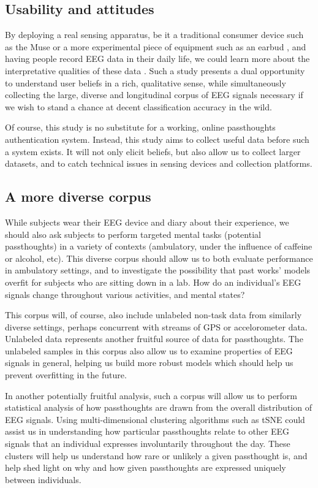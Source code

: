 \documentclass[sigconf]{acmart}
\begin{document}
\subsection{Usability and attitudes}
\label{sec:org84ed4c0}
By deploying a real sensing apparatus, be it a traditional consumer device such as the Muse \cite{Mihajlovic2015} 
or a more experimental piece of equipment such as an earbud \cite{UnitedSciences}, 
and having people record EEG data in their daily life, we could learn more about the interpretative qualities of these data  \cite{NafusDawn;Sherman2014}.
Such a study presents a dual opportunity to understand user beliefs in a rich, qualitative sense, while simultaneously collecting the large, diverse and longitudinal corpus of EEG signals necessary if we wish to stand a chance at decent classification accuracy in the wild.

Of course, this study is no substitute for a working, online passthoughts authentication system.
Instead, this study aims to collect useful data before such a system exists.
It will not only elicit beliefs, 
but also allow us to collect larger datasets, 
and to catch technical issues in sensing devices and collection platforms.

\subsection{A more diverse corpus}
\label{sec:org890dc35}

While subjects wear their EEG device and diary about their experience, we should also ask subjects to perform
targeted mental tasks (potential passthoughts) in a variety of contexts (ambulatory, under the influence of caffeine or alcohol, etc). 
This diverse corpus should allow us to both evaluate performance in ambulatory settings, and to
investigate the possibility that past works' models overfit for subjects who are sitting down in a lab.
How do an individual's EEG signals change throughout various activities, and mental states?

This corpus will, of course, also include unlabeled non-task data from similarly diverse settings, perhaps concurrent with streams of GPS or accelorometer data.
Unlabeled data represents another fruitful source of data for passthoughts.
The unlabeled samples in this corpus also allow us to examine properties of EEG signals in general, helping us build more robust models which should help us prevent overfitting in the future.

In another potentially fruitful analysis, such a corpus will allow us to perform statistical analysis of how passthoughts are drawn from the overall distribution of EEG signals. 
Using multi-dimensional clustering algorithms such as tSNE \cite{VanDerMaaten2008} 
could assist us in understanding how particular passthoughts relate to other EEG signals that an individual expresses involuntarily throughout the day. 
These clusters will help us understand how rare or unlikely a given passthought is, and help shed light on why and how given passthoughts are expressed uniquely between individuals.
\end{document}
